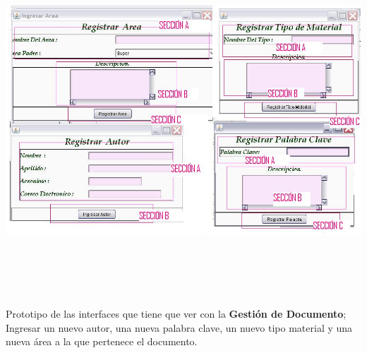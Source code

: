 \begin{minipage}{1\textwidth}
	\begin{center}
	\includegraphics[width= 17cm , height= 13cm]{prototiposGui/gestionDocumento.JPG}
	\end{center}
	{Prototipo de las interfaces que tiene que ver con la {\bf Gestión de Documento}; Ingresar un
	nuevo autor, una nueva palabra clave, un nuevo tipo material y una nueva área a la que
	pertenece el documento. }
\end{minipage}

%